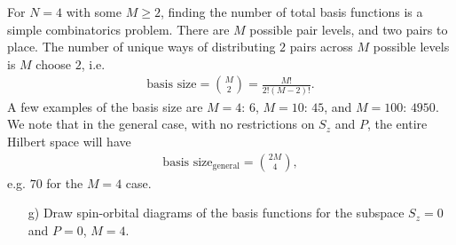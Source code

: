 \documentclass[a4paper]{article}
\begin{document}
For $N=4$ with some $M\ge 2$, finding the number of total basis functions is a simple combinatorics problem. There are $M$ possible pair levels, and two pairs to place. The number of unique ways of distributing $2$ pairs across $M$ possible levels is $M$ choose $2$, i.e.
\begin{align}
\text{basis size} = {M\choose2} = \frac{M!}{2!(M-2)!}.
\end{align}
A few examples of the basis size are $M=4$: $6$, $M=10$: $45$, and $M=100$: $4950$. We note that in the general case, with no restrictions on $S_z$ and $P$, the entire Hilbert space will have 
\begin{align}
\text{basis size}_\text{general} = {2M\choose4},
\end{align}
e.g. $70$ for the $M=4$ case.

\begin{exframe}
\begin{itemize}
  \item[g)] Draw spin-orbital diagrams of the basis functions for the subspace $S_z=0$ and $P=0$, $M=4$. 
\end{itemize}
\end{exframe}
\end{document}
